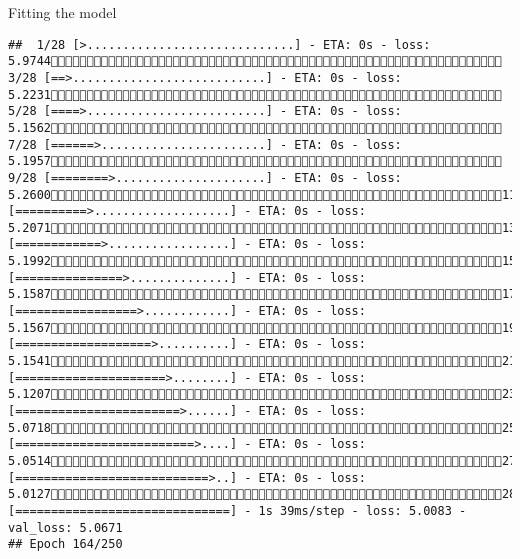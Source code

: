 \documentclass[
  ignorenonframetext,
]{beamer}
\begin{document}
\begin{frame}[fragile]{Fitting the model}
\begin{verbatim}
##  1/28 [>.............................] - ETA: 0s - loss: 5.9744 3/28 [==>...........................] - ETA: 0s - loss: 5.2231 5/28 [====>.........................] - ETA: 0s - loss: 5.1562 7/28 [======>.......................] - ETA: 0s - loss: 5.1957 9/28 [========>.....................] - ETA: 0s - loss: 5.260011/28 [==========>...................] - ETA: 0s - loss: 5.207113/28 [============>.................] - ETA: 0s - loss: 5.199215/28 [===============>..............] - ETA: 0s - loss: 5.158717/28 [=================>............] - ETA: 0s - loss: 5.156719/28 [===================>..........] - ETA: 0s - loss: 5.154121/28 [=====================>........] - ETA: 0s - loss: 5.120723/28 [=======================>......] - ETA: 0s - loss: 5.071825/28 [=========================>....] - ETA: 0s - loss: 5.051427/28 [===========================>..] - ETA: 0s - loss: 5.012728/28 [==============================] - 1s 39ms/step - loss: 5.0083 - val_loss: 5.0671
## Epoch 164/250

\end{verbatim}
\end{frame}
\end{document}
